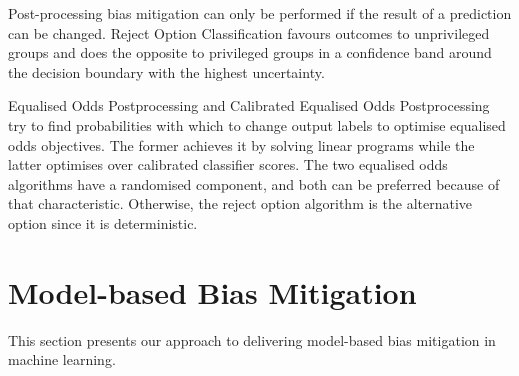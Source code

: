 \documentclass[sigconf,review]{acmart}
\begin{document}
	
	
	Post-processing bias mitigation can only be performed if the result of a prediction can be changed. Reject Option Classification \cite{kamiran2012reject} favours outcomes to unprivileged groups and does the opposite to privileged groups in a confidence band around the decision boundary with the highest uncertainty.
	{Equalised Odds Postprocessing \cite{hardt2016equal,pleiss2017equal} and Calibrated Equalised Odds Postprocessing \cite{pleiss2017equal} try to find probabilities with which to change output labels to optimise equalised odds objectives. The former achieves it by solving linear programs while the latter optimises over calibrated classifier scores. The two equalised odds algorithms have a randomised component, and both can be preferred because of that characteristic. Otherwise, the reject option algorithm is the alternative option since it is deterministic.
		
		\section{Model-based Bias Mitigation}
		\label{sec:model_based_bias_mitigation}
		
		This section presents our approach to delivering model-based bias mitigation in machine learning. 
		
}
\end{document}
